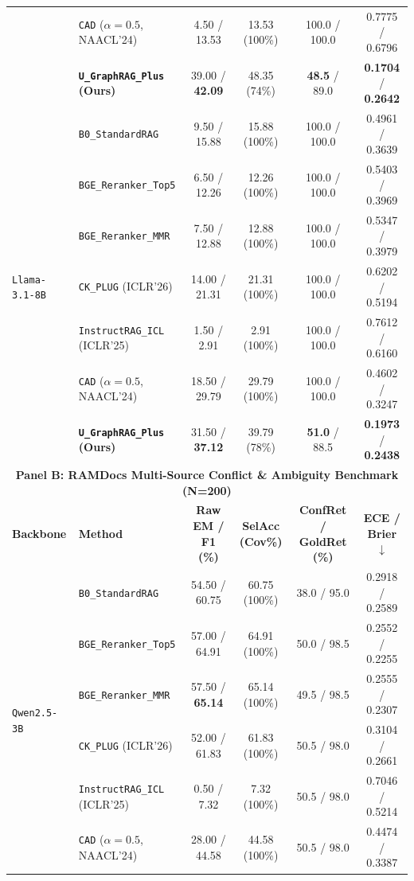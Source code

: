 \documentclass[11pt]{article}
\begin{document}
\begin{table}[t]
{{\begin{tabular}{llcccc}
& \texttt{CAD} ($\alpha=0.5$, NAACL'24) & 4.50 / 13.53 & 13.53 (100\%) & 100.0 / 100.0 & 0.7775 / 0.6796 \\
& \textbf{\texttt{U\_GraphRAG\_Plus} (Ours)} & 39.00 / \textbf{42.09} & 48.35 (74\%) & \textbf{48.5} / 89.0 & \textbf{0.1704} / \textbf{0.2642} \\
\midrule
\multirow{7}{*}{\texttt{Llama-3.1-8B}}
& \texttt{B0\_StandardRAG} & 9.50 / 15.88 & 15.88 (100\%) & 100.0 / 100.0 & 0.4961 / 0.3639 \\
& \texttt{BGE\_Reranker\_Top5} & 6.50 / 12.26 & 12.26 (100\%) & 100.0 / 100.0 & 0.5403 / 0.3969 \\
& \texttt{BGE\_Reranker\_MMR} & 7.50 / 12.88 & 12.88 (100\%) & 100.0 / 100.0 & 0.5347 / 0.3979 \\
& \texttt{CK\_PLUG} (ICLR'26) & 14.00 / 21.31 & 21.31 (100\%) & 100.0 / 100.0 & 0.6202 / 0.5194 \\
& \texttt{InstructRAG\_ICL} (ICLR'25) & 1.50 / 2.91 & 2.91 (100\%) & 100.0 / 100.0 & 0.7612 / 0.6160 \\
& \texttt{CAD} ($\alpha=0.5$, NAACL'24) & 18.50 / 29.79 & 29.79 (100\%) & 100.0 / 100.0 & 0.4602 / 0.3247 \\
& \textbf{\texttt{U\_GraphRAG\_Plus} (Ours)} & 31.50 / \textbf{37.12} & 39.79 (78\%) & \textbf{51.0} / 88.5 & \textbf{0.1973} / \textbf{0.2438} \\
\midrule
\midrule
\multicolumn{6}{c}{\textbf{Panel B: RAMDocs Multi-Source Conflict \& Ambiguity Benchmark (N=200)}} \\
\midrule
\textbf{Backbone} & \textbf{Method} & \textbf{Raw EM / F1 (\%)} & \textbf{SelAcc (Cov\%)} & \textbf{ConfRet / GoldRet (\%)} & \textbf{ECE / Brier $\downarrow$} \\
\midrule
\multirow{7}{*}{\texttt{Qwen2.5-3B}}
& \texttt{B0\_StandardRAG} & 54.50 / 60.75 & 60.75 (100\%) & 38.0 / 95.0 & 0.2918 / 0.2589 \\
& \texttt{BGE\_Reranker\_Top5} & 57.00 / 64.91 & 64.91 (100\%) & 50.0 / 98.5 & 0.2552 / 0.2255 \\
& \texttt{BGE\_Reranker\_MMR} & 57.50 / \textbf{65.14} & 65.14 (100\%) & 49.5 / 98.5 & 0.2555 / 0.2307 \\
& \texttt{CK\_PLUG} (ICLR'26) & 52.00 / 61.83 & 61.83 (100\%) & 50.5 / 98.0 & 0.3104 / 0.2661 \\
& \texttt{InstructRAG\_ICL} (ICLR'25) & 0.50 / 7.32 & 7.32 (100\%) & 50.5 / 98.0 & 0.7046 / 0.5214 \\
& \texttt{CAD} ($\alpha=0.5$, NAACL'24) & 28.00 / 44.58 & 44.58 (100\%) & 50.5 / 98.0 & 0.4474 / 0.3387 \\

\end{tabular}}}
\end{table}
\end{document}
